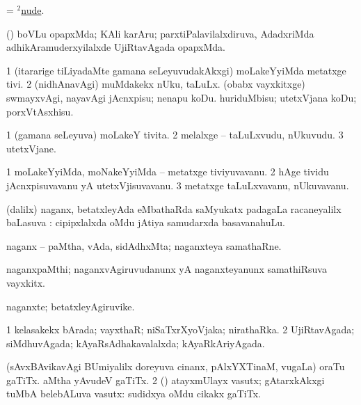 \noindent
\gl{\pagu}
\bmng
{} = \hyperlink{nude(2)4}{$^2$nude}. 
\emng
\eentry

\bentry
{}
\gl{\nA}
\bmng
(\nAyxshA) boVLu opapxMda; KAli karAru; parxtiPalavilalxdiruva, AdadxriMda adhikAramuderxyilalxde UjiRtavAgada opapxMda. 
\emng
\eentry

\bentry
{}
\gl{\sakirx}
\bmng
\bnum
\num{1} (itararige tiLiyadaMte gamana seLeyuvudakAkxgi) moLakeYyiMda metatxge tivi. 
\num{2} (nidhAnavAgi) muMdakekx nUku, taLuLx. 
 (obabx vayxkitxge) swmayxvAgi, nayavAgi 
\banum
{} jAcnxpisu; nenapu koDu. 
 huriduMbisu; utetxVjana koDu; porxVtAsxhisu. 
\eanum
\numie
\enum
\emng
\eentry

\bentry
{}
\gl{\nA}
\bmng
\bnum
\num{1} (gamana seLeyuva) moLakeY tivita. 
\num{2} melalxge -- taLuLxvudu, nUkuvudu. 
\num{3} utetxVjane. 
\enum
\emng
\eentry

\bentry
{}
\gl{\nA}
\bmng
\bnum
\num{1} moLakeYyiMda, moNakeYyiMda -- metatxge tiviyuvavanu. 
\num{2} hAge tividu jAcnxpisuvavanu yA utetxVjisuvavanu. 
\num{3} metatxge taLuLxvavanu, nUkuvavanu. 
\enum
\emng
\eentry

\bentry
{}
\gl{\sapUpa}
\bmng
(\pArxvi dalilx) naganx, betatxleyAda eMbathaRda saMyukatx padagaLa racaneyalilx baLasuva \pUparx:  cipipxlalxda oMdu jAtiya samudarxda basavanahuLu. 
\emng
\eentry

\bentry
{}
\gl{\nA}
\bmng
naganx -- paMtha, vAda, sidAdhxMta; naganxteya samathaRne. 
\emng
\eentry

\bentry
{}
\gl{\nA}
\bmng
naganxpaMthi; naganxvAgiruvudanunx yA naganxteyanunx samathiRsuva vayxkitx. 
\emng
\eentry

\bentry
{}
\gl{\nA}
\bmng
naganxte; betatxleyAgiruvike. 
\emng
\eentry

\bentry
{}
\gl{\gu}
\bmng
\bnum
\num{1} kelasakekx bArada; vayxthaR; niSaTxrXyoVjaka; nirathaRka. 
\num{2} UjiRtavAgada; siMdhuvAgada; kAyaRsAdhakavalalxda; kAyaRkAriyAgada. 
\enum
\emng
\eentry

\bentry
{}
\gl{\nA}
\bmng
\bnum
{} 
\banum
{} (sAvxBAvikavAgi BUmiyalilx doreyuva cinanx, pAlxYXTinaM, \mo vugaLa) oraTu gaTiTx. 
 aMtha yAvudeV gaTiTx. 
\eanum
\numie
\num{2} (\rUpa) atayxmUlayx vasutx; gAtarxkAkxgi tuMbA belebALuva vasutx:  sudidxya oMdu cikakx gaTiTx. 
\enum
\emng
\eentry

